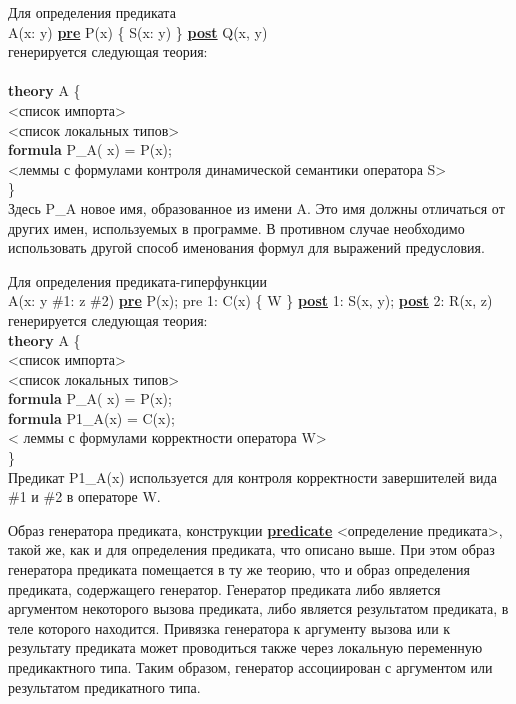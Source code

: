\documentclass[12pt,a4paper]{article}
\begin{document}
Для определения предиката \\
A(x: y) \underline{\textbf{pre}} P(x) \{ S(x: y) \} \underline{\textbf{post}} Q(x, y) \\
генерируется следующая теория: \\ \\
\textbf{theory} A \{ \\
<список импорта> \\
<список локальных типов> \\
\textbf{formula} P\_A( x) = P(x); \\
<леммы с формулами контроля динамической семантики  оператора S> \\
\}\\
Здесь P\_A   новое имя, образованное из имени A. Это имя должны отличаться от других имен, используемых в программе. В противном случае необходимо использовать другой способ именования формул для выражений предусловия.

Для определения предиката-гиперфункции \\
A(x: y \#1: z \#2) \underline{\textbf{pre}} P(x); pre 1: C(x) \{ W \} \underline{\textbf{post}} 1: S(x, y); \underline{\textbf{post}} 2: R(x, z)
генерируется следующая теория: \\
\textbf{theory} A \{ \\
	<список импорта> \\
	<список локальных типов> \\
  \textbf{formula} P\_A( x) = P(x); \\
	\textbf{formula} P1\_A(x) = C(x); \\
	< леммы с формулами корректности оператора W> \\
\} \\
Предикат P1\_A(x) используется для контроля корректности завершителей вида \#1 и \#2 в операторе W.

Образ генератора предиката, конструкции \underline{\textbf{predicate}} <определение предиката>, такой же, как и для определения предиката, что описано выше. При этом образ генератора предиката помещается в ту же теорию, что и образ определения предиката, содержащего генератор. Генератор предиката либо является аргументом некоторого вызова предиката, либо является результатом предиката, в теле которого находится. Привязка генератора к аргументу вызова или к результату предиката может проводиться также через локальную переменную предикактного типа. Таким образом, генератор ассоциирован с аргументом или результатом предикатного типа.
\end{document}
